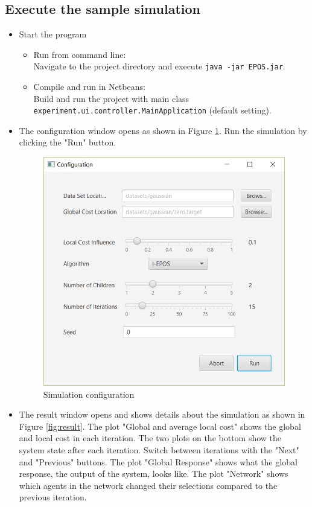 \documentclass[11pt]{article} %
\newcommand{\code}{\texttt}
\begin{document}
\subsection{Execute the sample simulation}
\begin{itemize}
	\item Start the program
	\begin{itemize}
	\item Run from command line:\\
Navigate to the project directory and execute \code{java -jar EPOS.jar}.
	\item Compile and run in Netbeans:\\
Build and run the project with main class \code{experiment.ui.controller.MainApplication} (default setting).
	\end{itemize}
	\item The configuration window opens as shown in Figure \ref{fig:config}. Run the simulation by clicking the "Run" button.
\begin{figure}[h]
\centering
\includegraphics[scale=0.6]{img/configuration.png}
\caption{Simulation configuration}
\label{fig:config}
\end{figure}
	\item The result window opens and shows details about the simulation as shown in Figure \ref{fig:result}. The plot "Global and average local cost" shows the global and local cost in each iteration. The two plots on the bottom show the system state after each iteration. Switch between iterations with the "Next" and "Previous" buttons. The plot "Global Response" shows what the global response, the output of the system, looks like. The plot "Network" shows which agents in the network changed their selections compared to the previous iteration.

\end{itemize}
\end{document}
